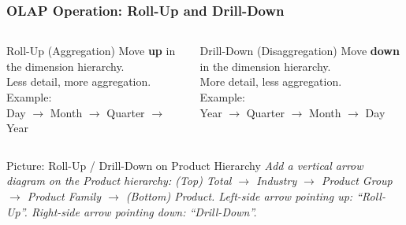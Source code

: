 
\begin{frame}
  \frametitle{OLAP Operation: Roll-Up and Drill-Down}

  \begin{columns}[T]
    \begin{block}{Roll-Up (Aggregation)}
      Move \textbf{up} in the dimension hierarchy.\\
      Less detail, more aggregation.\\
      Example:\\
      Day $\to$ Month $\to$ Quarter $\to$ Year
    \end{block}

    \begin{block}{Drill-Down (Disaggregation)}
      Move \textbf{down} in the dimension hierarchy.\\
      More detail, less aggregation.\\
      Example:\\
      Year $\to$ Quarter $\to$ Month $\to$ Day
    \end{block}
  \end{columns}

  \vspace{0.5em}
  \begin{alertblock}{Picture: Roll-Up / Drill-Down on Product Hierarchy}
    \textit{Add a vertical arrow diagram on the Product hierarchy:
    (Top) Total $\to$ Industry $\to$ Product Group $\to$ Product Family $\to$ (Bottom) Product.
    Left-side arrow pointing up: ``Roll-Up''.
    Right-side arrow pointing down: ``Drill-Down''.}
  \end{alertblock}
\end{frame}

